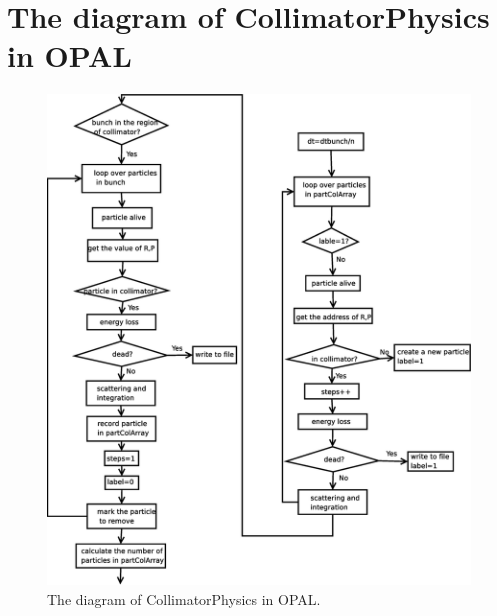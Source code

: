 \documentclass{article}
\begin{document}
\section{The diagram of CollimatorPhysics in OPAL}
\begin{figure}[H]
\begin{center}
\includegraphics*[width=1.2\textwidth]{diagram}
\end{center}
\caption{The diagram of CollimatorPhysics in OPAL. }
\label{fig:diagram}
\end{figure}
\end{document}
